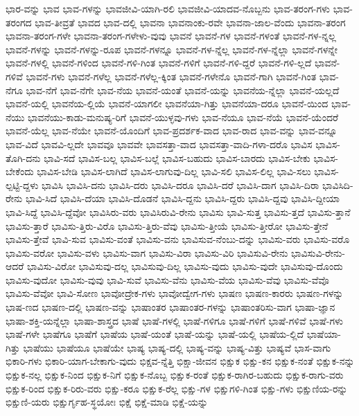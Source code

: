 {ಭಾರ-ವನ್ನು
ಭಾವ
ಭಾವ-ಗಳನ್ನು
ಭಾವಜೀವಿ-ಯಾಗಿ-ರಲಿ
ಭಾವಜೀವಿ-ಯಾದವ-ನೊಬ್ಬನು
ಭಾವ-ತರಂಗ-ಗಳು
ಭಾವ-ತರಂಗದ
ಭಾವ-ತೀವ್ರತೆ
ಭಾವದ
ಭಾವ-ದಲ್ಲಿ
ಭಾವನಾ
ಭಾವನಾಂಕು-ರವೇ
ಭಾವನಾ-ಜಾಲ-ವೆಂದು
ಭಾವನಾ-ತರಂಗ
ಭಾವನಾ-ತರಂಗ-ಗಳೇ
ಭಾವನಾ-ತರಂಗ-ಗಳೇಳು-ವುವು
ಭಾವನೆ
ಭಾವನೆ-ಗಳ
ಭಾವನೆ-ಗಳಂತೆ
ಭಾವನೆ-ಗಳ-ನ್ನಲ್ಲ
ಭಾವನೆ-ಗಳನ್ನು
ಭಾವನೆ-ಗಳನ್ನು-ರೂಪ
ಭಾವನೆ-ಗಳನ್ನೂ
ಭಾವನೆ-ಗಳ-ನ್ನೆಲ್ಲ
ಭಾವನೆ-ಗಳ-ನ್ನೆಲ್ಲಾ
ಭಾವನೆ-ಗಳನ್ನೇ
ಭಾವನೆ-ಗಳಲ್ಲಿ
ಭಾವನೆ-ಗಳಿಂದ
ಭಾವನೆ-ಗಳಿ-ಗಿಂತ
ಭಾವನೆ-ಗಳಿಗೆ
ಭಾವನೆ-ಗಳಿ-ದ್ದರೆ
ಭಾವನೆ-ಗಳಿ-ಲ್ಲದೆ
ಭಾವನೆ-ಗಳಿವೆ
ಭಾವನೆ-ಗಳು
ಭಾವನೆ-ಗಳೆಲ್ಲ
ಭಾವನೆ-ಗಳೆಲ್ಲ-ಕ್ಕಿಂತ
ಭಾವನೆ-ಗಳೇನೊ
ಭಾವನೆ-ಗಾಗಿ
ಭಾವನೆ-ಗಿಂತ
ಭಾವ-ನೆಗೂ
ಭಾವ-ನೆಗೆ
ಭಾವ-ನೆಗೇ
ಭಾವ-ನೆಯ
ಭಾವನೆ-ಯಂತೆ
ಭಾವನೆ-ಯನ್ನು
ಭಾವನೆಯ-ನ್ನೆಲ್ಲಾ
ಭಾವನೆ-ಯಲ್ಲದೆ
ಭಾವನೆ-ಯಲ್ಲಿ
ಭಾವನೆಯ-ಲ್ಲಿಯೆ
ಭಾವನೆ-ಯಾಗಲೀ
ಭಾವನೆಯಾ-ಗಿತ್ತು
ಭಾವನೆಯಾ-ದರೂ
ಭಾವನೆ-ಯಿಂದ
ಭಾವ-ನೆಯು
ಭಾವನೆಯು-ಕಾಡು-ಮನುಷ್ಯ-ರಿಗೆ
ಭಾವನೆ-ಯುಳ್ಳವು-ಗಳು
ಭಾವ-ನೆಯೂ
ಭಾವ-ನೆಯೆ
ಭಾವನೆ-ಯೆಂದರೆ
ಭಾವನೆ-ಯೆಲ್ಲ
ಭಾವ-ನೆಯೇ
ಭಾವನೆ-ಯೊಂದಿಗೆ
ಭಾವ-ಪ್ರದರ್ಶಕ-ವಾದ
ಭಾವ-ರಾದ
ಭಾವ-ವನ್ನು
ಭಾವ-ವನ್ನೂ
ಭಾವ-ವಿದೆ
ಭಾವವಿ-ಲ್ಲದೇ
ಭಾವವೂ
ಭಾವವೇ
ಭಾವಸತ್ತಾ-ವಾದ
ಭಾವಸತ್ತಾ-ವಾದಿ-ಗಳಾ-ದರೊ
ಭಾವಿಸ
ಭಾವಿಸ-ತೊಗಿ-ದನು
ಭಾವಿ-ಸದೆ
ಭಾವಿಸ-ಬಲ್ಲ
ಭಾವಿಸ-ಬಲ್ಲೆ
ಭಾವಿಸ-ಬಹುದು
ಭಾವಿಸ-ಬಾರದು
ಭಾವಿಸ-ಬೇಕು
ಭಾವಿಸ-ಬೇಕೆಂದು
ಭಾವಿಸ-ಬೇಡಿ
ಭಾವಿಸ-ಲಾಗಿದೆ
ಭಾವಿಸ-ಲಾಗುವು-ದಿಲ್ಲ
ಭಾವಿ-ಸಲಿ
ಭಾವಿಸ-ಲಿಲ್ಲ
ಭಾವಿ-ಸಲು
ಭಾವಿಸ-ಲ್ಪಟ್ಟಿ-ದ್ದಳು
ಭಾವಿಸಿ
ಭಾವಿಸಿ-ದನು
ಭಾವಿಸಿ-ದರು
ಭಾವಿಸಿ-ದರೂ
ಭಾವಿಸಿ-ದರೆ
ಭಾವಿಸಿ-ದಾಗ
ಭಾವಿಸಿ-ದಿರಾ
ಭಾವಿಸಿದಿ-ರೇನು
ಭಾವಿ-ಸಿದೆ
ಭಾವಿಸಿ-ದೆಯಾ
ಭಾವಿಸಿ-ದೊಡನೆ
ಭಾವಿಸಿ-ದ್ದನು
ಭಾವಿಸಿ-ದ್ದರು
ಭಾವಿಸಿ-ದ್ದವು
ಭಾವಿಸಿ-ದ್ದೀಯಾ
ಭಾವಿ-ಸಿದ್ದೆ
ಭಾವಿಸಿ-ದ್ದೆವೋ
ಭಾವಿಸಿರು-ವರು
ಭಾವಿಸಿರುವಿ-ರೇನು
ಭಾವಿಸು
ಭಾವಿ-ಸುತ್ತ
ಭಾವಿಸು-ತ್ತದೆ
ಭಾವಿಸು-ತ್ತಾನೆ
ಭಾವಿಸು-ತ್ತಾರೆ
ಭಾವಿಸು-ತ್ತಿರು-ವಿರೊ
ಭಾವಿಸು-ತ್ತಿರು-ವೆವು
ಭಾವಿಸು-ತ್ತೀಯೆ
ಭಾವಿಸು-ತ್ತೀರೋ
ಭಾವಿಸು-ತ್ತೇನೆ
ಭಾವಿಸು-ತ್ತೇವೆ
ಭಾವಿ-ಸುವ
ಭಾವಿಸು-ವಂತೆ
ಭಾವಿಸು-ವನು
ಭಾವಿಸುವ-ನೆಂಬು-ದನ್ನು
ಭಾವಿಸು-ವರು
ಭಾವಿಸು-ವರೊ
ಭಾವಿಸು-ವರೋ
ಭಾವಿಸು-ವಳು
ಭಾವಿಸು-ವಾಗ
ಭಾವಿಸು-ವಿರಾ
ಭಾವಿಸು-ವಿರಿ
ಭಾವಿಸುವಿ-ರೇನು
ಭಾವಿಸುವಿ-ರೇನು-ಆದರೆ
ಭಾವಿಸು-ವಿರೋ
ಭಾವಿಸುವು-ದಲ್ಲ
ಭಾವಿಸುವು-ದಿಲ್ಲ
ಭಾವಿಸು-ವುದು
ಭಾವಿಸು-ವುದೇ
ಭಾವಿಸುವು-ದೊಂದು
ಭಾವಿಸು-ವುದೋ
ಭಾವಿಸು-ವುವು
ಭಾವಿ-ಸುವೆ
ಭಾವಿಸು-ವೆನು
ಭಾವಿಸು-ವೆಯ
ಭಾವಿಸು-ವೆವು
ಭಾವಿಸು-ವೆವೊ
ಭಾವಿಸು-ವೆವೋ
ಭಾವಿ-ಸೋಣ
ಭಾವೋದ್ರೇಕ-ಗಳು
ಭಾವೋದ್ವೇಗ-ಗಳು
ಭಾಷಣ
ಭಾಷಣ-ಕಾರರು
ಭಾಷಣ-ಗಳನ್ನು
ಭಾಷ-ಣದ
ಭಾಷಣ-ದಲ್ಲಿ
ಭಾಷಣ-ವನ್ನು
ಭಾಷಾಂತರ
ಭಾಷಾಂತರ-ಗಳನ್ನು
ಭಾಷಾಂತರಿಸು-ವಾಗ
ಭಾಷಾ-ಜ್ಞಾನ
ಭಾಷಾ-ಶಕ್ತಿ-ಯನ್ನೆಲ್ಲಾ
ಭಾಷಾ-ಶಾಸ್ತ್ರದ
ಭಾಷೆ
ಭಾಷೆ-ಗಳಲ್ಲಿ
ಭಾಷೆ-ಗಳಿಗೂ
ಭಾಷೆ-ಗಳಿಗೆ
ಭಾಷೆ-ಗಳಿವೆ
ಭಾಷೆ-ಗಳು
ಭಾಷೆ-ಗಳೇ
ಭಾಷೆಗೂ
ಭಾಷೆಗೆ
ಭಾಷೆಯ
ಭಾಷೆ-ಯಂತೆ
ಭಾಷೆ-ಯನ್ನು
ಭಾಷೆ-ಯಲ್ಲಿ
ಭಾಷೆಯ-ಲ್ಲಿದೆ
ಭಾಷೆಯಾ-ಗಿತ್ತು
ಭಾಷೆಯು
ಭಾಷೆಯೂ
ಭಾಷೆಯೇ
ಭಾಷ್ಯ
ಭಾಷ್ಯ-ದಲ್ಲಿ
ಭಾಷ್ಯ-ವನ್ನು
ಭಾಷ್ಯ-ವಿತ್ತು
ಭಾಷ್ಯವೆ
ಭಾಸ-ವಾಗು
ಭಿಕಾರಿ-ಗಳು
ಭಿಕಾರಿ-ಯಾಗ-ಬೇಕಾಗು-ವುದು
ಭಿಕ್ಷವ-ನ್ನೆತ್ತಿ
ಭಿಕ್ಷಾ-ಜೀವನ
ಭಿಕ್ಷುಕ
ಭಿಕ್ಷು-ಕನ
ಭಿಕ್ಷುಕ-ನಂತೆ
ಭಿಕ್ಷುಕ-ನನ್ನು
ಭಿಕ್ಷುಕ-ನಲ್ಲ
ಭಿಕ್ಷುಕ-ನಿಂದ
ಭಿಕ್ಷುಕ-ನಿಗೆ
ಭಿಕ್ಷುಕ-ನೊಬ್ಬ
ಭಿಕ್ಷುಕ-ರಂತೆ
ಭಿಕ್ಷುಕ-ರಾಗಿರ-ಬಹುದು
ಭಿಕ್ಷುಕ-ರಾಗು-ವರು
ಭಿಕ್ಷುಕ-ರಿಂದ
ಭಿಕ್ಷುಕ-ರಿರು-ವರು
ಭಿಕ್ಷು-ಕರೂ
ಭಿಕ್ಷುಕ-ರೆಲ್ಲ
ಭಿಕ್ಷು-ಗಳ
ಭಿಕ್ಷುಗಳಿ-ಗಿಂತ
ಭಿಕ್ಷು-ಗಳು
ಭಿಕ್ಷುಣಿಯ-ರನ್ನು
ಭಿಕ್ಷುಣಿ-ಯರು
ಭಿಕ್ಷುರ್ಗೃಹ-ಸ್ಥಯೋಃ
ಭಿಕ್ಷೆ
ಭಿಕ್ಷೆ-ಮಾಡಿ
ಭಿಕ್ಷೆ-ಯನ್ನು
}
